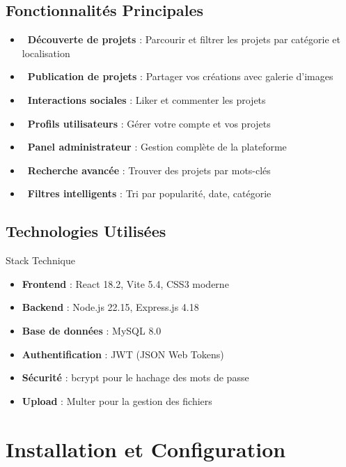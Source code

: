 \documentclass[12pt,a4paper]{article}
\begin{document}
\subsection{Fonctionnalités Principales}

\begin{itemize}[leftmargin=*]
    \item \textbf{\faGlobe\ Découverte de projets} : Parcourir et filtrer les projets par catégorie et localisation
    \item \textbf{\faUpload\ Publication de projets} : Partager vos créations avec galerie d'images
    \item \textbf{\faHeart\ Interactions sociales} : Liker et commenter les projets
    \item \textbf{\faUser\ Profils utilisateurs} : Gérer votre compte et vos projets
    \item \textbf{\faUserShield\ Panel administrateur} : Gestion complète de la plateforme
    \item \textbf{\faSearch\ Recherche avancée} : Trouver des projets par mots-clés
    \item \textbf{\faFilter\ Filtres intelligents} : Tri par popularité, date, catégorie
\end{itemize}

\subsection{Technologies Utilisées}

\begin{infobox}{Stack Technique}
\begin{itemize}[leftmargin=*]
    \item \textbf{Frontend} : React 18.2, Vite 5.4, CSS3 moderne
    \item \textbf{Backend} : Node.js 22.15, Express.js 4.18
    \item \textbf{Base de données} : MySQL 8.0
    \item \textbf{Authentification} : JWT (JSON Web Tokens)
    \item \textbf{Sécurité} : bcrypt pour le hachage des mots de passe
    \item \textbf{Upload} : Multer pour la gestion des fichiers
\end{itemize}
\end{infobox}

\newpage
\section{Installation et Configuration}
\end{document}
